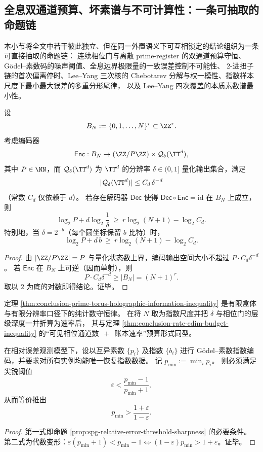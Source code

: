 \subsection{全息双通道预算、坏素谱与不可计算性：一条可抽取的命题链}\label{subsec:conclusion-holographic-proposition-chain}
本小节将全文中若干彼此独立、但在同一外置语义下可互相锁定的结论组织为一条可直接抽取的命题链：
连续相位门与离散 prime-register 的双通道预算守恒、Gödel--素数码的噪声阈值、全息边界极限量的一致误差控制不可能性、
\(2\)-进扭子链的首次偏离停时、Lee--Yang 三次核的 Chebotarev 分解与权一模性、指数样本尺度下最小最大误差的多重分形尾律，
以及 Lee--Yang 四次覆盖的本质素数谱最小性。

\begin{theorem}[圆维–素数寄存器双通道的全息信息守恒不等式]\label{thm:conclusion-prime-torus-holographic-information-inequality}
设
\[
B_N:=\{0,1,\dots,N\}^r\subset\ZZ^r.
\]
考虑编码器
\[
\mathsf{Enc}:B_N\to (\ZZ/P\ZZ)\times \mathcal Q_\delta(\TT^d),
\]
其中 \(P\in\NN\)，而 \(\mathcal Q_\delta(\TT^d)\) 为 \(\TT^d\) 的分辨率 \(\delta\in(0,1]\) 量化输出集合，满足
\[
|\mathcal Q_\delta(\TT^d)|\le C_d\,\delta^{-d}
\]
（常数 \(C_d\) 仅依赖于 \(d\)）。
若存在解码器 \(\mathsf{Dec}\) 使得 \(\mathsf{Dec}\circ\mathsf{Enc}=\mathrm{id}\) 在 \(B_N\) 上成立，则
\[
\log_2 P+d\log_2\frac{1}{\delta}\ \ge\ r\log_2(N+1)-\log_2 C_d.
\]
特别地，当 \(\delta=2^{-b}\)（每个圆坐标保留 \(b\) 比特）时，
\[
\log_2 P+d\,b\ \ge\ r\log_2(N+1)-\log_2 C_d.
\]
\end{theorem}
\begin{proof}
由 \(|\ZZ/P\ZZ|=P\) 与量化状态数上界，编码输出空间大小不超过 \(P\cdot C_d\delta^{-d}\)。
若 \(\mathsf{Enc}\) 在 \(B_N\) 上可逆（因而单射），则
\[
P\cdot C_d\delta^{-d}\ge |B_N|=(N+1)^r.
\]
取以 \(2\) 为底的对数即得结论。证毕。
\end{proof}

\begin{remark}[与速率圆维预算口径的一致性]\label{rem:conclusion-prime-torus-holographic-information-inequality-rate-alignment}
定理 \ref{thm:conclusion-prime-torus-holographic-information-inequality} 是有限盒体与有限分辨率口径下的纯计数守恒律。
在将 \(N\) 取为指数尺度并把 \(\delta\) 与相位门的层级深度一并折算为速率后，
其与定理 \ref{thm:conclusion-rate-cdim-budget-inequality} 的“可见相位通道数 \(\,+\,\) 账本速率”预算形式同型。
\end{remark}

\begin{corollary}\label{cor:conclusion-godel-prime-noise-threshold-pmin}
在相对误差观测模型下，设以互异素数 \(\{p_i\}\) 及指数 \(\{b_i\}\) 进行 Gödel--素数指数编码，并要求对所有实例均能唯一恢复指数数据。
记 \(p_{\min}:=\min_i p_i\)。
则必须满足尖锐阈值
\[
\varepsilon<\frac{p_{\min}-1}{p_{\min}+1},
\]
从而等价推出
\[
p_{\min}>\frac{1+\varepsilon}{1-\varepsilon}.
\]
\end{corollary}
\begin{proof}
第一式即命题 \ref{prop:spg-relative-error-threshold-sharpness} 的必要条件。
第二式为代数变形：\(\varepsilon(p_{\min}+1)<p_{\min}-1\iff (1-\varepsilon)p_{\min}>1+\varepsilon\)。证毕。
\end{proof}

